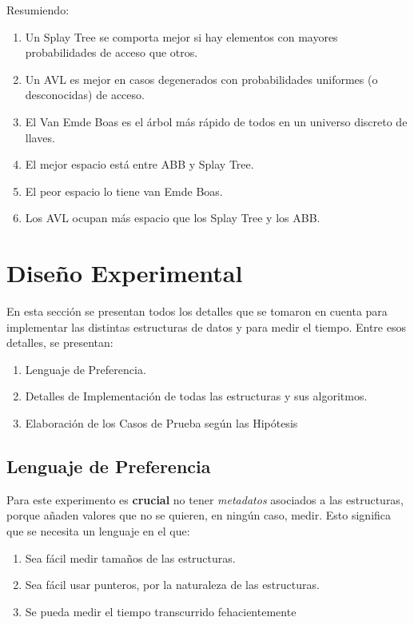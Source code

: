 \documentclass[12pt,letterpaper]{report}
\begin{document}
Resumiendo:

\begin{enumerate}
\item Un Splay Tree se comporta mejor si hay elementos con mayores probabilidades de acceso que otros.
\item Un AVL es mejor en casos degenerados con probabilidades uniformes (o desconocidas) de acceso.
\item El Van Emde Boas es el árbol más rápido de todos en un universo discreto de llaves.
\item El mejor espacio está entre ABB y Splay Tree.
\item El peor espacio lo tiene van Emde Boas.
\item Los AVL ocupan más espacio que los Splay Tree y los ABB.
\end{enumerate}


\newpage
\section{Diseño Experimental}
En esta sección se presentan todos los detalles que se tomaron en cuenta para implementar las distintas estructuras de datos y para medir el tiempo. Entre esos detalles, se presentan:
\begin{enumerate}
\item Lenguaje de Preferencia.
\item Detalles de Implementación de todas las estructuras y sus algoritmos.
\item Elaboración de los Casos de Prueba según las Hipótesis
\end{enumerate}

\subsection{Lenguaje de Preferencia}
\label{subsec:lenguaje}
Para este experimento es \textbf{crucial} no tener \emph{metadatos} asociados a las estructuras, porque añaden valores que no se quieren, en ningún caso, medir. Esto significa que se necesita un lenguaje en el que:
\begin{enumerate}
\item Sea fácil medir tamaños de las estructuras.
\item Sea fácil usar punteros, por la naturaleza de las estructuras.
\item Se pueda medir el tiempo transcurrido fehacientemente
\end{enumerate}
\end{document}
